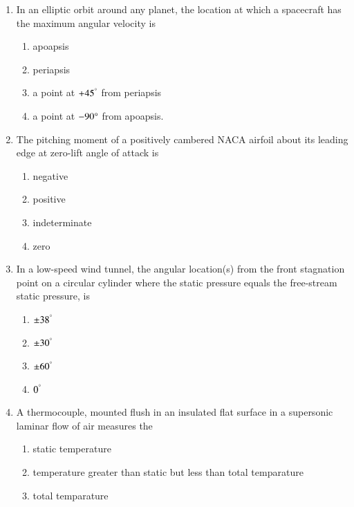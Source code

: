 \documentclass[journal,12pt,onecolumn]{IEEEtran}
\theoremstyle{remark}
\begin{document}
\begin{enumerate}
\begin{enumerate}
	\item $r=\frac{\brak{\frac{h^2}{\mu}}}{1-e\cos\theta}$
	\item $r=\frac{\brak{\frac{h^2}{\mu}}}{e-\cos\theta}$
	\item $r=\frac{\brak{\frac{h^2}{\mu}}}{1+e\cos\theta}$
	\item $r=\frac{\brak{\frac{h^2}{\mu}}}e+\cos\theta}$
\end{enumerate}
\item In an elliptic orbit around any planet, the location at which a spacecraft has the maximum angular velocity is
\begin{enumerate}
    \item apoapsis
    \item periapsis
    \item a point at $+45^\degree$ from periapsis
    \item a point at $-90\degree$ from apoapsis.
\end{enumerate}
\item The pitching moment of a positively cambered NACA airfoil about its leading edge at zero-lift  angle of attack is
\begin{enumerate}
    \item negative
    \item positive
    \item indeterminate
    \item zero
\end{enumerate}
\item In a low-speed wind tunnel, the angular location(s) from the front stagnation point on a circular cylinder where the static pressure equals the free-stream static pressure, is
\begin{enumerate}
    \item $\pm38^\degree$
    \item $\pm30^\degree$
    \item $\pm60^\degree$
    \item $0^\degree$
\end{enumerate}
\item A thermocouple, mounted flush in an insulated flat surface in a supersonic laminar flow of air measures the 
\begin{enumerate}
    \item static temperature
    \item temperature greater than static but less than total temparature
    \item total temparature

\end{enumerate}
\end{enumerate}
\end{document}
